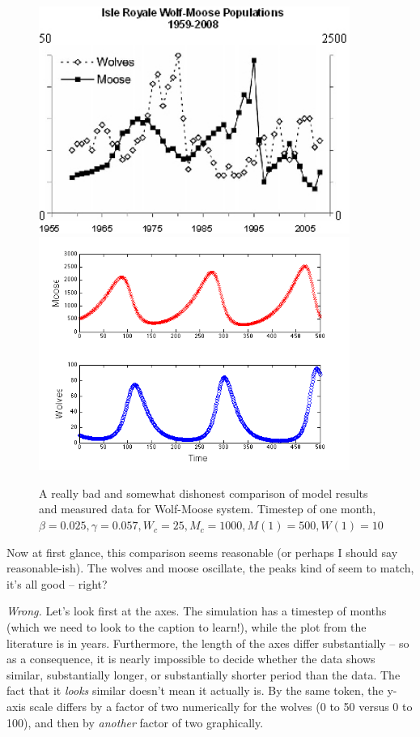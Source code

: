 \documentclass{tufte-handout}
\begin{document}
\begin{figure}[h!]
\includegraphics[width=4in]{figs/wolfmoosedata.jpg}
\includegraphics[width=4in]{figs/StackedWolfMooseTImeSeries}
\caption{A really bad and somewhat dishonest comparison of model results and measured data  for Wolf-Moose system. Timestep of one month,   $\beta = 0.025, \gamma = 0.057, W_c = 25, M_c=1000, M(1) = 500, W(1) = 10$}
\end{figure}

Now at first glance, this comparison seems reasonable (or perhaps I should say reasonable-ish).  The wolves and moose oscillate, the peaks kind of seem to match, it's all good -- right?

{\it Wrong.} Let's  look first at the axes.  The simulation has a timestep of months (which we need to look to the caption to learn!), while the plot from the literature is in years.  Furthermore, the length of the axes differ substantially -- so as a consequence, it is nearly impossible to decide whether the data shows similar, substantially longer, or substantially shorter period than the data.  The fact that it {\it looks} similar doesn't mean it actually is.  By the same token, the y-axis scale differs by a factor of two numerically for the wolves (0 to 50 versus 0 to 100), and then by {\it another} factor of two graphically.
\end{document}
